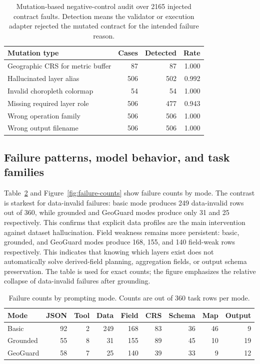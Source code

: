 \documentclass[12pt]{gsis}  %
\begin{document}
\begin{table}[htbp]
\centering
\caption{Mutation-based negative-control audit over 2165 injected contract faults. Detection means the validator or execution adapter rejected the mutated contract for the intended failure reason.}
\label{tab:negative-control}
\small
\setlength{\tabcolsep}{4pt}
\begin{tabular}{lrrr}
\toprule
Mutation type & Cases & Detected & Rate \\
\midrule
Geographic CRS for metric buffer & 87 & 87 & 1.000 \\
Hallucinated layer alias & 506 & 502 & 0.992 \\
Invalid choropleth colormap & 54 & 54 & 1.000 \\
Missing required layer role & 506 & 477 & 0.943 \\
Wrong operation family & 506 & 506 & 1.000 \\
Wrong output filename & 506 & 506 & 1.000 \\
\bottomrule
\end{tabular}
\end{table}

\subsection{Failure patterns, model behavior, and task families}

Table~\ref{tab:failure-summary} and Figure~\ref{fig:failure-counts} show failure counts by mode. The contrast is starkest for data-invalid failures: basic mode produces 249 data-invalid rows out of 360, while grounded and GeoGuard modes produce only 31 and 25 respectively. This confirms that explicit data profiles are the main intervention against dataset hallucination. Field weakness remains more persistent: basic, grounded, and GeoGuard modes produce 168, 155, and 140 field-weak rows respectively. This indicates that knowing which layers exist does not automatically solve derived-field planning, aggregation fields, or output schema preservation. The table is used for exact counts; the figure emphasizes the relative collapse of data-invalid failures after grounding.

\begin{table}[htbp]
\centering
\caption{Failure counts by prompting mode. Counts are out of 360 task rows per mode.}
\label{tab:failure-summary}
\small
\setlength{\tabcolsep}{4pt}
\begin{tabular}{lrrrrrrrr}
\toprule
Mode & JSON & Tool & Data & Field & CRS & Schema & Map & Output \\
\midrule
Basic & 92 & 2 & 249 & 168 & 83 & 36 & 46 & 9 \\
Grounded & 55 & 8 & 31 & 155 & 89 & 45 & 10 & 19 \\
GeoGuard & 58 & 7 & 25 & 140 & 39 & 33 & 9 & 12 \\
\bottomrule
\end{tabular}
\end{table}
\end{document}
